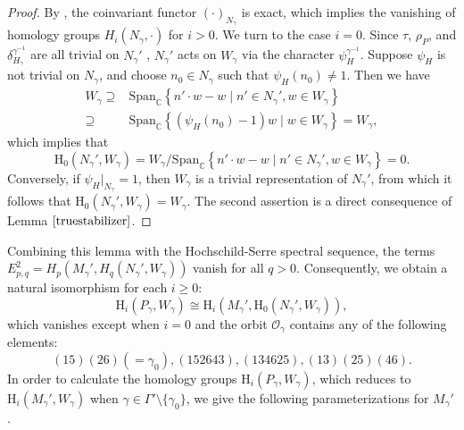 \documentclass[12pt]{amsart}
\newcommand{\RH}{{\mathrm {H}}}
\newcommand{\Span}{{\mathrm{Span}}}
\theoremstyle{Theorem}
\theoremstyle{Theorem}
\theoremstyle{Theorem}
\theoremstyle{Theorem}
\theoremstyle{Plain}
\theoremstyle{remark}
\theoremstyle{remark}
\theoremstyle{Definition}
\begin{document}
\begin{proof}
    By \cite[Proposition 1.9]{B-Z}, the coinvariant functor $ ( \cdot )_{ N_\gamma } $ is exact, which implies the vanishing of homology groups $ H_i ( N_\gamma, \cdot ) $ for $ i  > 0 $. We turn to the case $ i = 0 $. Since $\tau$, $\rho_P$, and $ \delta_{ H_\gamma }^{ \gamma^{-1} } $ are all trivial on $N_\gamma'$ , $N_\gamma'$ acts on $W_\gamma$ via the character $ \psi_H^{ \gamma^{-1} } $. Suppose $\psi_H$ is not trivial on $N_\gamma$, and choose $ n_0 \in N_\gamma $ such that $ \psi_H ( n_0 ) \ne 1 $. Then we have
    \[
        \begin{aligned}
            W_\gamma \supseteq & \Span_\mathbb{C} \left\{ n' \cdot w - w \mid n' \in  N_\gamma', w \in W_\gamma \right\}               \\
                     \supseteq & \Span_\mathbb{C} \left \{ \left( \psi_H ( n_0 ) - 1 \right) w \mid w \in W_\gamma \right\} = W_\gamma,
        \end{aligned}
    \]
    which implies that 
    \[
        \RH_0 \left( N_\gamma', W_\gamma \right) = W_\gamma / \Span_\mathbb{C} \left\{ n' \cdot w - w \mid n' \in N_\gamma', w \in W_\gamma \right\} = 0.
    \]
    Conversely, if $ \psi_H|_{ N_\gamma } = 1 $, then $W_\gamma$ is a trivial representation of $N_\gamma'$, from which it follows that $ \RH_0 \left( N_\gamma', W_\gamma \right) = W_\gamma $. The second assertion is a direct consequence of Lemma $ \ref{truestabilizer} $.
\end{proof}

Combining this lemma with the Hochschild-Serre spectral sequence, the terms $ E_{p,q}^2 = H_p ( M_\gamma', H_q ( N_\gamma', W_\gamma ) ) $ vanish for all $ q > 0 $. Consequently, we obtain a natural isomorphism for each $ i \ge 0 $:
\[
    \RH_i \left( P_\gamma, W_\gamma \right) \cong \RH_i \left( M_\gamma', \RH_0 \left( N_\gamma', W_\gamma \right) \right),
\]
which vanishes except when $ i = 0 $ and the orbit $ \mathcal{O}_\gamma $ contains any of the following elements:
\[
    (15)(26) (=\gamma_0), (152643), (134625), (13)(25)(46).
\]
In order to calculate the homology groups $ \RH_i \left( P_\gamma, W_\gamma \right) $, which reduces to $ \RH_i \left( M_\gamma', W_\gamma \right) $ when $ \gamma \in \Gamma' \setminus \{ \gamma_0 \} $, we give the following parameterizations for $M_\gamma'$.
\end{document}
